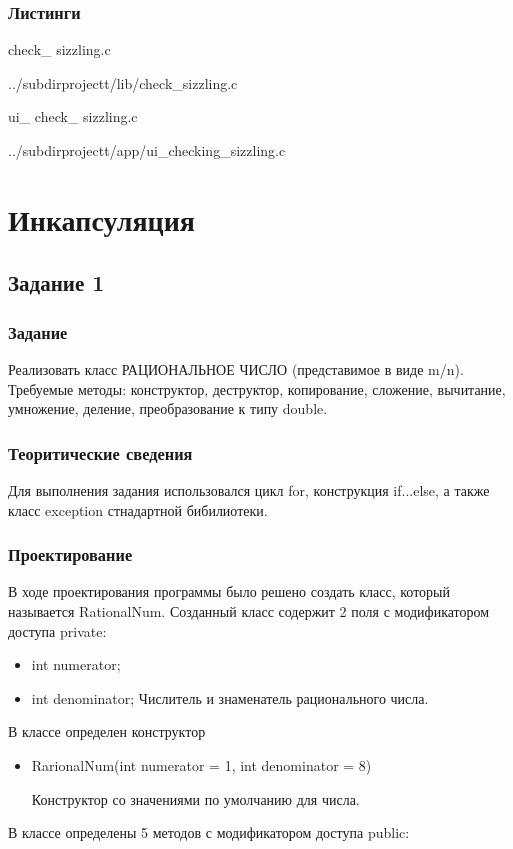 \documentclass[12pt,a4paper]{report}
\begin{document}
\subsection*{Листинги}
check\_ sizzling.c

{../subdirprojectt/lib/check_sizzling.c}

\vspace{\baselineskip}

ui\_ check\_ sizzling.c

{../subdirprojectt/app/ui_checking_sizzling.c}


\chapter{Инкапсуляция}
\section{Задание 1}
\subsection{Задание}

Реализовать класс РАЦИОНАЛЬНОЕ ЧИСЛО (представимое в виде m/n). Требуемые методы: конструктор, деструктор, копирование, сложение, вычитание, умножение, деление, преобразование к типу double.

\subsection{Теоритические сведения}

Для выполнения задания использовался цикл for, конструкция if...else, а также класс exception стнадартной бибилиотеки.

\subsection{Проектирование}


В ходе проектирования программы было решено создать класс, который называется RationalNum.
Созданный класс содержит 2 поля с модификатором доступа private:

\begin{itemize}
	\item  int numerator;
    \item  int denominator;
    Числитель и знаменатель рационального числа.
\end{itemize}
	
	В классе определен конструктор 
\begin{itemize}

	\item RarionalNum(int numerator = 1, int denominator = 8)
	
	Конструктор со значениями по умолчанию для числа. 
	
			
\end{itemize}	
В классе определены 5 методов с модификатором доступа public:		
\end{document}
